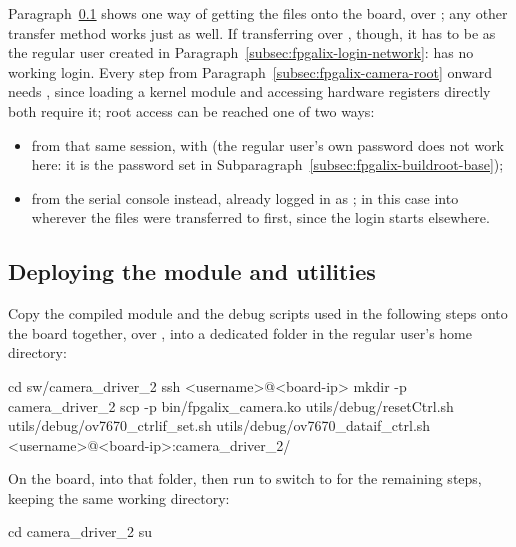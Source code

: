 Paragraph~\ref{subsec:fpgalix-camera-transfer} shows one way of getting the files onto the board, over ; any other transfer method works just as well. If transferring over , though, it has to be as the regular user created in Paragraph~\ref{subsec:fpgalix-login-network}:  has no working  login. Every step from Paragraph~\ref{subsec:fpgalix-camera-root} onward needs , since loading a kernel module and accessing hardware registers directly both require it; root access can be reached one of two ways:

\begin{itemize}
    \item from that same  session, with  (the regular user's own password does not work here: it is the  password set in Subparagraph~\ref{subsec:fpgalix-buildroot-base});
    \item from the serial console instead, already logged in as ; in this case  into wherever the files were transferred to first, since the  login starts elsewhere.
\end{itemize}

\subsection{Deploying the module and utilities}
\label{subsec:fpgalix-camera-transfer}

Copy the compiled module and the debug scripts used in the following steps onto the board together, over , into a dedicated  folder in the regular user's home directory:

\begin{shellcodehost}
cd sw/camera_driver_2
ssh <username>@<board-ip> mkdir -p camera_driver_2
scp -p bin/fpgalix_camera.ko utils/debug/resetCtrl.sh utils/debug/ov7670_ctrlif_set.sh utils/debug/ov7670_dataif_ctrl.sh <username>@<board-ip>:camera_driver_2/
\end{shellcodehost}

On the board,  into that folder, then run  to switch to  for the remaining steps, keeping the same working directory:

\begin{shellcodeboard}
cd camera_driver_2
su
\end{shellcodeboard}

